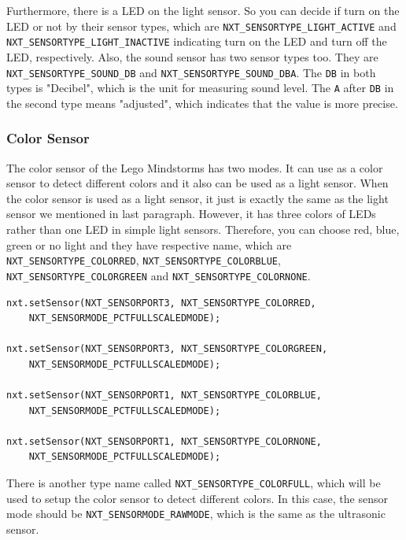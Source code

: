 \documentclass[11pt]{article}
\begin{document}
Furthermore, there is a LED on the light sensor. So you can decide if turn on 
the LED or not by their sensor types, which are {\tt NXT\_SENSORTYPE\_LIGHT\_ACTIVE} 
and {\tt NXT\_SENSORTYPE\_LIGHT\_INACTIVE} indicating turn on the LED and turn 
off the LED, respectively. Also, the sound sensor has two sensor types too. 
They are {\tt NXT\_SENSORTYPE\_SOUND\_DB} and {\tt NXT\_SENSORTYPE\_SOUND\_DBA}. 
The {\tt DB} in both types is "Decibel", which is the unit for measuring sound 
level. The {\tt A} after {\tt DB} in the second type means "adjusted", which 
indicates that the value is more precise.\\

\subsubsection*{Color Sensor}
The color sensor of the Lego Mindstorms has two modes. It can use as a color sensor 
to detect different colors and it also can be used as a light sensor. When the color 
sensor is used as a light sensor, it just is exactly the same as the light sensor we 
mentioned in last paragraph. However, it has three colors of LEDs rather than one LED 
in simple light sensors. Therefore, you can choose red, blue, green or no light and 
they have respective name, which are {\tt NXT\_SENSORTYPE\_COLORRED}, 
{\tt NXT\_SENSORTYPE\_COLORBLUE}, {\tt NXT\_SENSORTYPE\_COLORGREEN} and 
{\tt NXT\_SENSORTYPE\_COLORNONE}.
\begin{lstlisting}
nxt.setSensor(NXT_SENSORPORT3, NXT_SENSORTYPE_COLORRED,
    NXT_SENSORMODE_PCTFULLSCALEDMODE);

nxt.setSensor(NXT_SENSORPORT3, NXT_SENSORTYPE_COLORGREEN,
    NXT_SENSORMODE_PCTFULLSCALEDMODE);

nxt.setSensor(NXT_SENSORPORT1, NXT_SENSORTYPE_COLORBLUE,
    NXT_SENSORMODE_PCTFULLSCALEDMODE);

nxt.setSensor(NXT_SENSORPORT1, NXT_SENSORTYPE_COLORNONE,
    NXT_SENSORMODE_PCTFULLSCALEDMODE);
\end{lstlisting}
There is another type name called {\tt NXT\_SENSORTYPE\_COLORFULL}, which will 
be used to setup the color sensor to detect different colors. In this case, the 
sensor mode should be {\tt NXT\_SENSORMODE\_RAWMODE}, which is the same as the 
ultrasonic sensor.

\newpage
\end{document}
